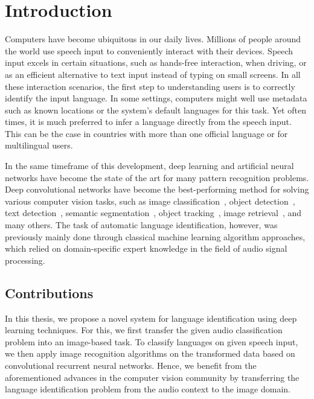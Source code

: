 \section{Introduction}


Computers have become ubiquitous in our daily lives. Millions of people around the world use speech input to conveniently interact with their devices.
Speech input excels in certain situations, such as hands-free interaction, when driving, or as an efficient alternative to text input instead of typing on small screens.
In all these interaction scenarios, the first step to understanding users is to correctly identify the input language. In some settings, computers might well use metadata such as known locations or the system's default languages for this task. Yet often times, it is much preferred to infer a language directly from the speech input. This can be the case in countries with more than one official language or for multilingual users. 

In the same timeframe of this development, deep learning and artificial neural networks have become the state of the art for many pattern recognition problems. 
Deep convolutional networks have become the best-performing method for solving various computer vision tasks, such as image classification~\cite{russakovsky2015imagenet}, object detection~\cite{russakovsky2015imagenet, everingham2010pascal}, text detection~\cite{Yang2016SceneTextRegAR, jaderberg2014synthetic}, semantic segmentation~\cite{dai2016instance, girshick2014rich}, object tracking~\cite{nam2016learning}, image retrieval~\cite{tolias2015particular}, and many others. 
The task of automatic language identification, however, was previously mainly done through classical machine learning algorithm approaches, which relied on domain-specific expert knowledge in the field of audio signal processing.



\subsection{Contributions}
In this thesis, we propose a novel system for language identification using deep learning techniques. For this, we first transfer the given audio classification problem into an image-based task. To classify languages on given speech input, we then apply image recognition algorithms on the transformed data based on convolutional recurrent neural networks. Hence, we benefit from the aforementioned advances in the computer vision community by transferring the language identification problem from the audio context to the image domain.

